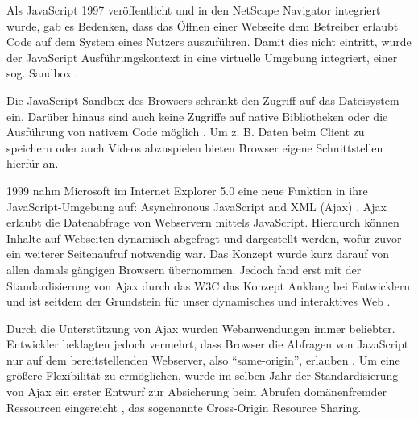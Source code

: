 
Als JavaScript 1997 veröffentlicht und in den NetScape Navigator integriert wurde, gab es Bedenken, dass das Öffnen einer Webseite dem Betreiber erlaubt Code auf dem System eines Nutzers auszuführen. Damit dies nicht eintritt, wurde der JavaScript Ausführungskontext in eine virtuelle Umgebung integriert, einer sog. Sandbox \cite{LearningJavaScript}.

Die JavaScript-Sandbox des Browsers schränkt den Zugriff auf das Dateisystem ein. Darüber hinaus sind auch keine Zugriffe auf native Bibliotheken oder die Ausführung von nativem Code möglich \cite{TheSpyInTheSandbox}. Um z. B. Daten beim Client zu speichern oder auch Videos abzuspielen bieten Browser eigene Schnittstellen hierfür an.


1999 nahm Microsoft im Internet Explorer 5.0 eine neue Funktion in ihre JavaScript-Umgebung auf: Asynchronous JavaScript and XML (Ajax) \cite{MDNAjax}. Ajax erlaubt die Datenabfrage von Webservern mittels JavaScript. Hierdurch können Inhalte auf Webseiten dynamisch abgefragt und dargestellt werden, wofür zuvor ein weiterer Seitenaufruf notwendig war. Das Konzept wurde kurz darauf von allen damals gängigen Browsern übernommen. Jedoch fand erst mit der Standardisierung von Ajax durch das W3C \cite{TheXMLHttpRequestObject} das Konzept Anklang bei Entwicklern \cite{AngularForEnterpriseReadyWebApplications} \cite{FinkIntroducingSPAs} und ist seitdem der Grundstein für unser dynamisches und interaktives Web \cite{ResearchOnAJAXTechnology}.

Durch die Unterstützung von Ajax wurden Webanwendungen immer beliebter. Entwickler beklagten jedoch vermehrt, dass Browser die Abfragen von JavaScript nur auf dem bereitstellenden Webserver, also \enquote{same-origin}, erlauben \cite{CrossSiteXHRWithCORS}. Um eine größere Flexibilität zu ermöglichen, wurde im selben Jahr der Standardisierung von Ajax ein erster Entwurf zur Absicherung beim Abrufen domänenfremder Ressourcen eingereicht \cite{AuthorizingCORS}, das sogenannte Cross-Origin Resource Sharing.

